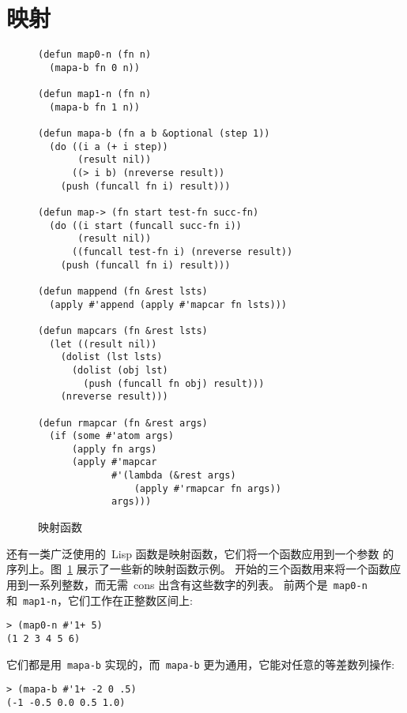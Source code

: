 \section{映射}
\label{sec:mapping}

\begin{figure}
\begin{lstlisting}
(defun map0-n (fn n)
  (mapa-b fn 0 n))

(defun map1-n (fn n)
  (mapa-b fn 1 n))

(defun mapa-b (fn a b &optional (step 1))
  (do ((i a (+ i step))
       (result nil))
      ((> i b) (nreverse result))
    (push (funcall fn i) result)))

(defun map-> (fn start test-fn succ-fn)
  (do ((i start (funcall succ-fn i))
       (result nil))
      ((funcall test-fn i) (nreverse result))
    (push (funcall fn i) result)))

(defun mappend (fn &rest lsts)
  (apply #'append (apply #'mapcar fn lsts)))

(defun mapcars (fn &rest lsts)
  (let ((result nil))
    (dolist (lst lsts)
      (dolist (obj lst)
        (push (funcall fn obj) result)))
    (nreverse result)))

(defun rmapcar (fn &rest args)
  (if (some #'atom args)
      (apply fn args)
      (apply #'mapcar
             #'(lambda (&rest args)
                 (apply #'rmapcar fn args))
             args)))
\end{lstlisting}
\caption{\label{fig:mapping_functions}
  映射函数}
\end{figure}

还有一类广泛使用的~Lisp 函数是映射函数，它们将一个函数应用到一个参数
的序列上。图~\ref{fig:mapping_functions} 展示了一些新的映射函数示例。
开始的三个函数用来将一个函数应用到一系列整数，而无需~cons 出含有这些数字的列表。
前两个是~\texttt{map0-n} 和~\texttt{map1-n}，它们工作在正整数区间上:
\begin{lstlisting}
> (map0-n #'1+ 5)
(1 2 3 4 5 6)
\end{lstlisting}
它们都是用~\texttt{mapa-b} 实现的，而~\texttt{mapa-b} 更为通用，它能对任意的等差数列操作:
\begin{lstlisting}
> (mapa-b #'1+ -2 0 .5)
(-1 -0.5 0.0 0.5 1.0)
\end{lstlisting}


